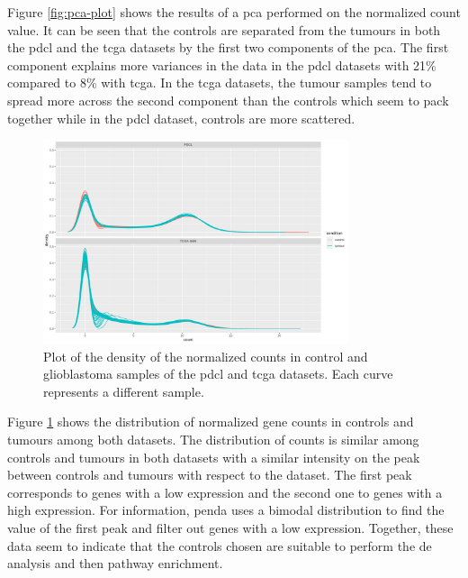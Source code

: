 Figure \ref*{fig:pca-plot} shows the results of a \acrfull{pca} performed on the normalized count value.
It can be seen that the controls are separated from the tumours in both the \acrshort{pdcl} and the \acrshort{tcga} datasets by the first two components of the \acrshort{pca}.
The first component explains more variances in the data in the \acrshort{pdcl} datasets with 21\% compared to 8\% with \acrshort{tcga}.
In the \acrshort{tcga} datasets, the tumour samples tend to spread more across the second component than the controls which seem to pack together while in the \acrshort{pdcl} dataset, controls are more scattered. 

\begin{figure}
    \begin{center}
        \includegraphics[width=0.8\textwidth]{img/density_plot}
        \caption{
            Plot of the density of the normalized counts in control and glioblastoma samples of the \acrshort{pdcl} and \acrshort{tcga} datasets.
            Each curve represents a different sample.
        }
        \label{fig:density-plot}
    \end{center}
\end{figure}

Figure \ref*{fig:density-plot} shows the distribution of normalized gene counts in controls and tumours among both datasets.
The distribution of counts is similar among controls and tumours in both datasets with a similar intensity on the peak between controls and tumours with respect to the dataset.
The first peak corresponds to genes with a low expression and the second one to genes with a high expression.
For information, \acrshort{penda} uses a bimodal distribution to find the value of the first peak and filter out genes with a low expression.
Together, these data seem to indicate that the controls chosen are suitable to perform the \acrlong{de} analysis and then pathway enrichment.

